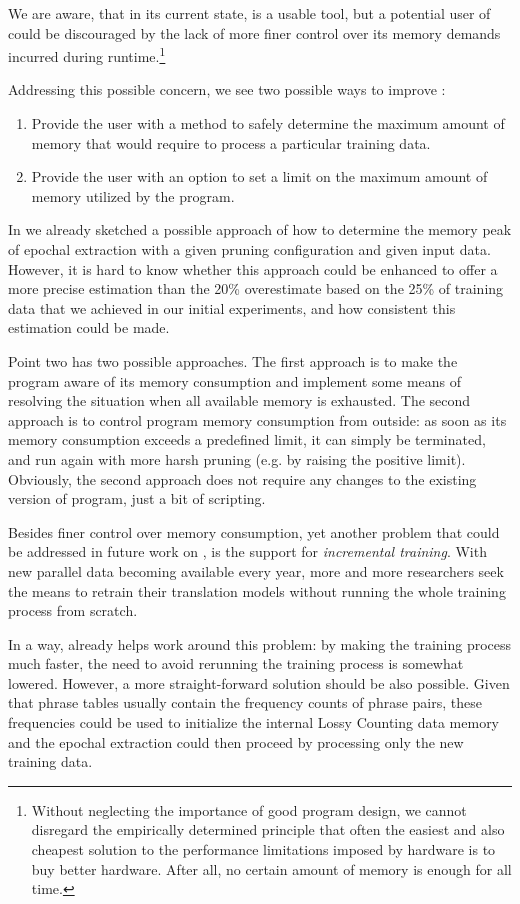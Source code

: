 We are aware, that in its current state, \eppex{} is a usable tool,
but a potential user of \eppex{} could be discouraged by the lack of more
finer control over its memory demands incurred during
runtime.\footnote{Without neglecting the importance of good program design,
we cannot disregard the empirically determined principle that often the easiest
and also cheapest solution to the performance limitations imposed by hardware
is to buy better hardware. After all, no certain amount of memory is enough
for all time.}

Addressing this possible concern, we see two possible ways to improve \eppex{}:
\begin{enumerate}
  \item Provide the user with a method to safely determine the maximum amount
    of memory that \eppex{} would require to process a particular training data.
  \item Provide the user with an option to set a limit on the maximum amount
    of memory utilized by the program.
\end{enumerate}

In  we already sketched a possible approach of how to determine
the memory peak of epochal extraction with a given pruning configuration and given input data.
However, it is hard to know whether this approach could be enhanced to offer
a more precise estimation than the 20\% overestimate based on the 25\% of training
data that we achieved in our initial experiments, and how consistent this estimation
could be made.

Point two has two possible approaches.
The first approach is to make the program aware of its memory consumption and implement
some means of resolving the situation when all available memory is exhausted.
The second approach is to control program memory consumption from outside:
as soon as its memory consumption exceeds a predefined limit, it can simply be terminated, 
and run again with more harsh pruning (e.g. by raising the positive limit).
Obviously, the second approach does not require any changes to the existing version of
program, just a bit of scripting.

Besides finer control over memory consumption, yet another problem that could
be addressed in future work on \eppex{}, is the support for \emph{incremental
training}.
With new parallel data becoming available every year, more and more researchers seek
the means to retrain their translation models without running the whole
training process from scratch.

In a way, \eppex{} already helps work around this problem: by making the training
process much faster, the need to avoid rerunning the training process is somewhat
lowered.
However, a more straight-forward solution should be also possible.
Given that phrase tables usually contain the frequency counts of phrase pairs,
these frequencies could be used to initialize the internal Lossy Counting data
memory and the epochal extraction could then proceed by processing only the new
training data.
